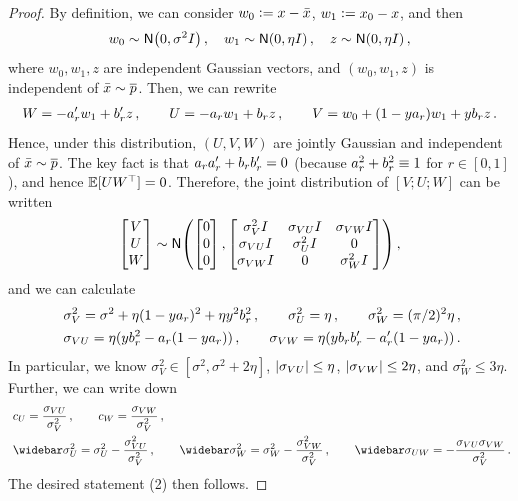 \begin{proof}
By definition, we can consider $w_0\vcentcolon= x-\bar{x}$, $w_1\vcentcolon= x_0-x$, and then
\begin{align*}
    w_0\sim \Nsigma\,, \quad
    w_1\sim \Neta\,, \quad z\sim \Neta\,,
\end{align*}
where $w_0,w_1,z$ are independent Gaussian vectors, and $(w_0,w_1,z)$ is independent of $\bar{x}\sim \overline{p}$.
Then, we can rewrite
\begin{align*}
    W%
    =-\alrp w_1+\blrp z\,, \qquad
    U%
    =-\alr w_1+\blr z\,, \qquad
    V=w_0+(1-y\alr)w_1+y\blr z\,.
\end{align*}
Hence, under this distribution, $(U,V,W)$ are jointly Gaussian and independent of $\bar{x}\sim \overline{p}$. The key fact is that $a_{r}a_{r}'+b_{r}b_{r}'=0$ (because $a_{r}^2+b_{r}^2\equiv 1$ for $r\in[0,1]$), and hence $\operatorname{\mathbb{E}}[UW^\top]=0$. Therefore, the joint distribution of $[V;U;W]$ can be written
\begin{align*}
    \begin{bmatrix} V \\ U \\ W \end{bmatrix}
    \sim \normal{\begin{bmatrix} 0 \\ 0 \\ 0 \end{bmatrix}, \begin{bmatrix}
        \sigma_V^2\Id & \sigma_{VU} \Id & \sigma_{VW} \Id\\
        \sigma_{VU} \Id & \sigma_U^2 \Id & 0 \\
        \sigma_{VW} \Id & 0 & \sigma_W^2 \Id
    \end{bmatrix}}\,,
\end{align*}
and we can calculate
\begin{align*}
    &~ \sigma_V^2=\sigma^2+\eta(1-ya_{r})^2+\eta y^2b_{r}^2\,, \qquad \sigma_U^2=\eta\,, \qquad 
    \sigma_W^2=(\pi/2)^2\eta\,, \\
    &~ \sigma_{VU}=\eta(yb_{r}^2-a_{r}(1-ya_{r}))\,, \qquad
    \sigma_{VW}=\eta(yb_{r}b_{r}'-a_{r}'(1-ya_{r}))\,.
\end{align*}
In particular, we know $\sigma_V^2\in[\sigma^2,\sigma^2+2\eta]$, $\lvert\sigma_{VU}\rvert\leq \eta$, $\lvert\sigma_{VW}\rvert\leq 2\eta$, and $\sigma_W^2\leq 3\eta$. Further, we can write down
\begin{align*}
    &~ c_U=\frac{\sigma_{VU}}{\sigma_V^2}\,, \qquad 
    c_W=\frac{\sigma_{VW}}{\sigma_V^2}\,, \\
    &~ \sigbar_U^2=\sigma_U^2-\frac{\sigma_{VU}^2}{\sigma_V^2}\,, \qquad
     \sigbar_W^2=\sigma_W^2-\frac{\sigma_{VW}^2}{\sigma_V^2}\,, \qquad
     \sigbar_{UW}=-\frac{\sigma_{VU}\sigma_{VW}}{\sigma_V^2}\,. 
\end{align*}
The desired statement (2) then follows.


\end{proof}
